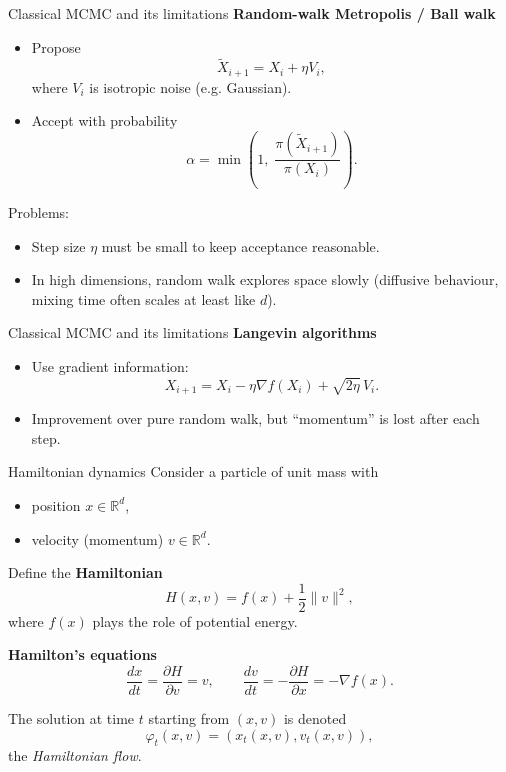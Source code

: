 \documentclass{beamer}
\begin{document}
\begin{frame}{Classical MCMC and its limitations}
  \textbf{Random-walk Metropolis / Ball walk}
  \begin{itemize}
    \item Propose
      \[
        \tilde X_{i+1} = X_i + \eta V_i,
      \]
      where $V_i$ is isotropic noise (e.g. Gaussian).
    \item Accept with probability
      \[
        \alpha = \min\left(1,\;\frac{\pi(\tilde X_{i+1})}{\pi(X_i)}\right).
      \]
  \end{itemize}
  Problems:
  \begin{itemize}
    \item Step size $\eta$ must be small to keep acceptance reasonable.
    \item In high dimensions, random walk explores space slowly
          (diffusive behaviour, mixing time often scales at least like $d$).
  \end{itemize}
  \end{frame}
  
\begin{frame}{Classical MCMC and its limitations}
  \vspace{0.2cm}
  \textbf{Langevin algorithms}
  \begin{itemize}
    \item Use gradient information:
      \[
        X_{i+1} = X_i - \eta \nabla f(X_i) + \sqrt{2\eta}\,V_i.
      \]
    \item Improvement over pure random walk, but “momentum” is lost after each step.
  \end{itemize}
\end{frame}

\begin{frame}{Hamiltonian dynamics}
  Consider a particle of unit mass with
  \begin{itemize}
    \item position $x \in \mathbb{R}^d$,
    \item velocity (momentum) $v \in \mathbb{R}^d$.
  \end{itemize}
  Define the \textbf{Hamiltonian}
  \[
    H(x,v) = f(x) + \frac{1}{2}\|v\|^2,
  \]
  where $f(x)$ plays the role of potential energy.

  \vspace{0.2cm}
  \textbf{Hamilton’s equations}
  \[
    \frac{dx}{dt} = \frac{\partial H}{\partial v} = v,
    \qquad
    \frac{dv}{dt} = -\frac{\partial H}{\partial x} = -\nabla f(x).
  \]

  The solution at time $t$ starting from $(x,v)$ is denoted
  \[
    \varphi_t(x,v) = (x_t(x,v), v_t(x,v)),
  \]
  the \emph{Hamiltonian flow}.
\end{frame}
\end{document}
